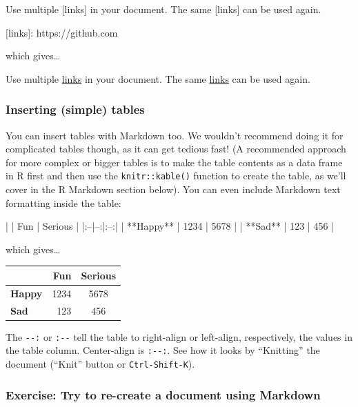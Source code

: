 \documentclass[]{Nemilov}
\newenvironment{Shaded}{\begin{snugshade}}{\end{snugshade}}
\newcommand{\NormalTok}[1]{#1}
\newcommand{\OtherTok}[1]{\textcolor[rgb]{0.56,0.35,0.01}{#1}}
\begin{document}
\begin{Shaded}
\begin{Highlighting}[]
\NormalTok{Use multiple [links] in your document. The same [links] can be used again.}

\OtherTok{[links]: https://github.com}
\end{Highlighting}
\end{Shaded}

which gives\ldots{}

Use multiple \href{https://github.com}{links} in your document. The same \href{https://github.com}{links} can be used again.

\hypertarget{inserting-simple-tables}{%
\subsubsection{Inserting (simple) tables}\label{inserting-simple-tables}}

You can insert tables with Markdown too. We wouldn't recommend doing it for
complicated tables though, as it can get tedious fast! (A recommended approach
for more complex or bigger tables is to make the table contents as a data frame
in R first and then use the \texttt{knitr::kable()} function to create the table, as
we'll cover in the R Markdown section below). You can even include Markdown
text formatting inside the table:

\begin{Shaded}
\begin{Highlighting}[]
\NormalTok{|   | Fun | Serious |}
\NormalTok{|:--|--:|:--:|}
\NormalTok{| **Happy** | 1234 | 5678 |}
\NormalTok{| **Sad** | 123 | 456 |}
\end{Highlighting}
\end{Shaded}

which gives\ldots{}

\begin{longtable}[]{@{}lrc@{}}
\toprule
& Fun & Serious\tabularnewline
\midrule
\endhead
\textbf{Happy} & 1234 & 5678\tabularnewline
\textbf{Sad} & 123 & 456\tabularnewline
\bottomrule
\end{longtable}

The \texttt{\textbar{}-\/-:\textbar{}} or \texttt{\textbar{}:-\/-\textbar{}} tell the table to right-align or left-align,
respectively, the values in the table column. Center-align is \texttt{\textbar{}:-\/-:\textbar{}}.
See how it looks by ``Knitting'' the document (``Knit'' button or \texttt{Ctrl-Shift-K}).

\hypertarget{exercise-try-to-re-create-a-document-using-markdown}{%
\subsubsection{Exercise: Try to re-create a document using Markdown}\label{exercise-try-to-re-create-a-document-using-markdown}}
\end{document}
